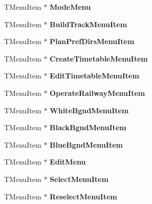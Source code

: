 \begin{DoxyCompactItemize}
T\+Menu\+Item $\ast$ {\bfseries Mode\+Menu}
\item 
\mbox{\label{class_t_interface_a0eae9e0686e45636f0c41ad79bbdb728}} 
T\+Menu\+Item $\ast$ {\bfseries Build\+Track\+Menu\+Item}
\item 
\mbox{\label{class_t_interface_a82e2f2e9a73b05e43112c57a3d297886}} 
T\+Menu\+Item $\ast$ {\bfseries Plan\+Pref\+Dirs\+Menu\+Item}
\item 
\mbox{\label{class_t_interface_ae75664e06a36b87e941850337aa1bf30}} 
T\+Menu\+Item $\ast$ {\bfseries Create\+Timetable\+Menu\+Item}
\item 
\mbox{\label{class_t_interface_a1657e4071f56177d4152ea08bc814b16}} 
T\+Menu\+Item $\ast$ {\bfseries Edit\+Timetable\+Menu\+Item}
\item 
\mbox{\label{class_t_interface_ad47a6d3170286d961a53e6d26823ecbf}} 
T\+Menu\+Item $\ast$ {\bfseries Operate\+Railway\+Menu\+Item}
\item 
\mbox{\label{class_t_interface_ae68c6a19c4d5dee4c613011760d9f514}} 
T\+Menu\+Item $\ast$ {\bfseries White\+Bgnd\+Menu\+Item}
\item 
\mbox{\label{class_t_interface_acafc632e158877bf086133e52fc784d2}} 
T\+Menu\+Item $\ast$ {\bfseries Black\+Bgnd\+Menu\+Item}
\item 
\mbox{\label{class_t_interface_a74349e233e71e06cae657e98fefa098c}} 
T\+Menu\+Item $\ast$ {\bfseries Blue\+Bgnd\+Menu\+Item}
\item 
\mbox{\label{class_t_interface_a00a0ac1771bafebcb60465ae2906e268}} 
T\+Menu\+Item $\ast$ {\bfseries Edit\+Menu}
\item 
\mbox{\label{class_t_interface_a5104175832dc24c5612088b997ec33a0}} 
T\+Menu\+Item $\ast$ {\bfseries Select\+Menu\+Item}
\item 
\mbox{\label{class_t_interface_a2921e637b86b676bb479862eff975077}} 
T\+Menu\+Item $\ast$ {\bfseries Reselect\+Menu\+Item}

\end{DoxyCompactItemize}
